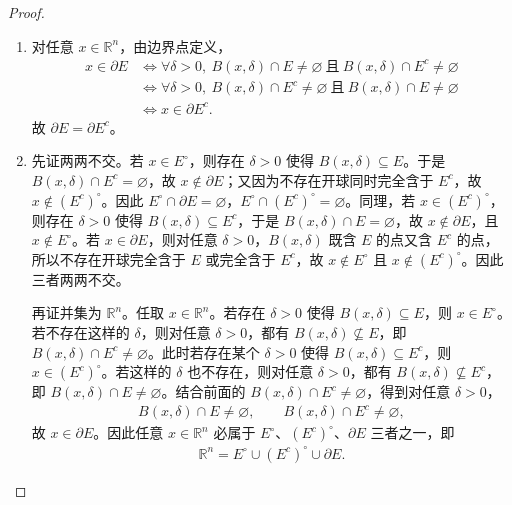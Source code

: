 \documentclass[../../main.tex]{subfiles}%
\begin{document}
\begin{proof}
\begin{enumerate}[(1)]
\item 对任意 \(x\in\mathbb{R}^n\)，由边界点定义，
\begin{align*}
x\in\partial E
&\iff \forall \delta>0,\ B(x,\delta)\cap E\neq\varnothing\ \text{且}\ B(x,\delta)\cap E^c\neq\varnothing\\
&\iff \forall \delta>0,\ B(x,\delta)\cap E^c\neq\varnothing\ \text{且}\ B(x,\delta)\cap E\neq\varnothing\\
&\iff x\in\partial E^c.
\end{align*}
故 \(\partial E=\partial E^c\)。

\item 先证两两不交。若 \(x\in E^\circ\)，则存在 \(\delta>0\) 使得 \(B(x,\delta)\subseteq E\)。于是 \(B(x,\delta)\cap E^c=\varnothing\)，故 \(x\notin\partial E\)；又因为不存在开球同时完全含于 \(E^c\)，故 \(x\notin (E^c)^\circ\)。因此 \(E^\circ\cap\partial E=\varnothing\)，\(E^\circ\cap (E^c)^\circ=\varnothing\)。同理，若 \(x\in (E^c)^\circ\)，则存在 \(\delta>0\) 使得 \(B(x,\delta)\subseteq E^c\)，于是 \(B(x,\delta)\cap E=\varnothing\)，故 \(x\notin\partial E\)，且 \(x\notin E^\circ\)。若 \(x\in\partial E\)，则对任意 \(\delta>0\)，\(B(x,\delta)\) 既含 \(E\) 的点又含 \(E^c\) 的点，所以不存在开球完全含于 \(E\) 或完全含于 \(E^c\)，故 \(x\notin E^\circ\) 且 \(x\notin (E^c)^\circ\)。因此三者两两不交。

再证并集为 \(\mathbb{R}^n\)。任取 \(x\in\mathbb{R}^n\)。若存在 \(\delta>0\) 使得 \(B(x,\delta)\subseteq E\)，则 \(x\in E^\circ\)。若不存在这样的 \(\delta\)，则对任意 \(\delta>0\)，都有 \(B(x,\delta)\not\subseteq E\)，即 \(B(x,\delta)\cap E^c\neq\varnothing\)。此时若存在某个 \(\delta>0\) 使得 \(B(x,\delta)\subseteq E^c\)，则 \(x\in (E^c)^\circ\)。若这样的 \(\delta\) 也不存在，则对任意 \(\delta>0\)，都有 \(B(x,\delta)\not\subseteq E^c\)，即 \(B(x,\delta)\cap E\neq\varnothing\)。结合前面的 \(B(x,\delta)\cap E^c\neq\varnothing\)，得到对任意 \(\delta>0\)，
\begin{align*}
B(x,\delta)\cap E\neq\varnothing,\qquad B(x,\delta)\cap E^c\neq\varnothing,
\end{align*}
故 \(x\in\partial E\)。因此任意 \(x\in\mathbb{R}^n\) 必属于 \(E^\circ\)、\((E^c)^\circ\)、\(\partial E\) 三者之一，即
\begin{align*}
\mathbb{R}^n=E^\circ\cup (E^c)^\circ\cup\partial E.
\end{align*}


\end{enumerate}
\end{proof}
\end{document}
